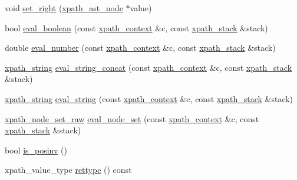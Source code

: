 \begin{DoxyCompactItemize}
\item 
void \hyperlink{classxpath__ast__node_afe044146db852b7d4dbf188fd2ff6c75}{set\-\_\-right} (\hyperlink{classxpath__ast__node}{xpath\-\_\-ast\-\_\-node} $\ast$value)
\item 
bool \hyperlink{classxpath__ast__node_ab7f965a92023bc2704b8e6fd9f3d7c14}{eval\-\_\-boolean} (const \hyperlink{structxpath__context}{xpath\-\_\-context} \&c, const \hyperlink{structxpath__stack}{xpath\-\_\-stack} \&stack)
\item 
double \hyperlink{classxpath__ast__node_a92dd7048e28d486bc7f382d1fc6f1de6}{eval\-\_\-number} (const \hyperlink{structxpath__context}{xpath\-\_\-context} \&c, const \hyperlink{structxpath__stack}{xpath\-\_\-stack} \&stack)
\item 
\hyperlink{classxpath__string}{xpath\-\_\-string} \hyperlink{classxpath__ast__node_aaf931a091af0fb91c25e90b205363b4e}{eval\-\_\-string\-\_\-concat} (const \hyperlink{structxpath__context}{xpath\-\_\-context} \&c, const \hyperlink{structxpath__stack}{xpath\-\_\-stack} \&stack)
\item 
\hyperlink{classxpath__string}{xpath\-\_\-string} \hyperlink{classxpath__ast__node_a6b675237a590548b68d0e0b97518b6df}{eval\-\_\-string} (const \hyperlink{structxpath__context}{xpath\-\_\-context} \&c, const \hyperlink{structxpath__stack}{xpath\-\_\-stack} \&stack)
\item 
\hyperlink{classxpath__node__set__raw}{xpath\-\_\-node\-\_\-set\-\_\-raw} \hyperlink{classxpath__ast__node_a30d98ec97e3129e82ac9ec3f2a759855}{eval\-\_\-node\-\_\-set} (const \hyperlink{structxpath__context}{xpath\-\_\-context} \&c, const \hyperlink{structxpath__stack}{xpath\-\_\-stack} \&stack)
\item 
bool \hyperlink{classxpath__ast__node_a9253f88832441a357ea65639c73a34be}{is\-\_\-posinv} ()
\item 
xpath\-\_\-value\-\_\-type \hyperlink{classxpath__ast__node_a2c3598521141ed4b763fe6c4f852234f}{rettype} () const 
\end{DoxyCompactItemize}
